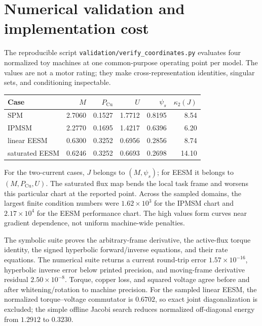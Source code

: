 \section{Numerical validation and implementation cost}
\label{sec:coordinate-validation}

The reproducible script \texttt{validation/verify\_coordinates.py} evaluates
four normalized toy machines at one common-purpose operating point per model.
The values are not a motor rating; they make cross-representation identities,
singular sets, and conditioning inspectable.

\begin{center}
\begin{tabular}{lrrrrr}
\toprule
Case & \(M\) & \(P_{\mathrm{Cu}}\) & \(U\) & \(\psi_s\) &
\(\kappa_2(J)\)\\
\midrule
SPM & 2.7060 & 0.1527 & 1.7712 & 0.8195 & 8.54\\
IPMSM & 2.2770 & 0.1695 & 1.4217 & 0.6396 & 6.20\\
linear EESM & 0.6300 & 0.3252 & 0.6956 & 0.2856 & 8.74\\
saturated EESM & 0.6246 & 0.3252 & 0.6693 & 0.2698 & 14.10\\
\bottomrule
\end{tabular}
\end{center}

For the two-current cases, \(J\) belongs to \((M,\psi_s)\); for EESM it
belongs to \((M,P_{\mathrm{Cu}},U)\). The saturated flux map bends the local
task frame and worsens this particular chart at the reported point. Across
the sampled domains, the largest finite condition numbers were
\(1.62\times10^3\) for the IPMSM chart and \(2.17\times10^4\) for the EESM
performance chart. The high values form curves near gradient dependence, not
uniform machine-wide penalties.



The symbolic suite proves the arbitrary-frame derivative, the active-flux
torque identity, the signed hyperbolic forward/inverse equations, and their
rate equations. The numerical suite returns a current round-trip error
\(1.57\times10^{-16}\), hyperbolic inverse error below printed precision, and
moving-frame derivative residual \(2.50\times10^{-8}\). Torque, copper loss,
and squared voltage agree before and after whitening/rotation to machine
precision. For the sampled linear EESM, the normalized torque--voltage
commutator is \(0.6702\), so exact joint diagonalization is excluded; the
simple offline Jacobi search reduces normalized off-diagonal energy from
\(1.2912\) to \(0.3230\).

